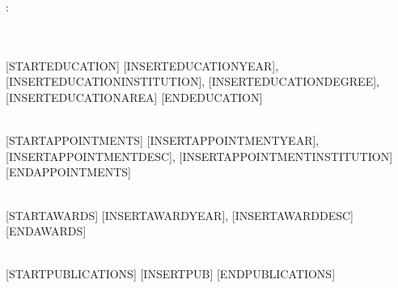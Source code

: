 :%

\NameBoldface{\color{\NameColor}{\NameSize [INSERTNAME] ([INSERTROLE]):}}\\
[INSERTAFFILIATION]

\SectionSpacing
{}\\
[STARTEDUCATION]
[INSERTEDUCATIONYEAR], [INSERTEDUCATIONINSTITUTION], [INSERTEDUCATIONDEGREE], [INSERTEDUCATIONAREA]
[ENDEDUCATION]

\SectionSpacing
{}\\
[STARTAPPOINTMENTS]
[INSERTAPPOINTMENTYEAR], [INSERTAPPOINTMENTDESC], [INSERTAPPOINTMENTINSTITUTION]
[ENDAPPOINTMENTS]

\SectionSpacing
{}\\
[STARTAWARDS]
[INSERTAWARDYEAR], [INSERTAWARDDESC]
[ENDAWARDS]

\SectionSpacing
{}\\
[STARTPUBLICATIONS]
{\PublicationBullet}[INSERTPUB]
[ENDPUBLICATIONS]

